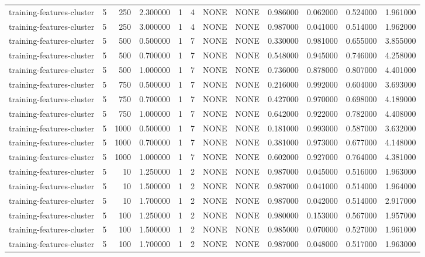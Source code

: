 \begin{tabular}{lrrrllllrrrr}
training-features-cluster & 5 & 250 & 2.300000 & 1 & 4 & NONE & NONE & 0.986000 & 0.062000 & 0.524000 & 1.961000 \\
training-features-cluster & 5 & 250 & 3.000000 & 1 & 4 & NONE & NONE & 0.987000 & 0.041000 & 0.514000 & 1.962000 \\
training-features-cluster & 5 & 500 & 0.500000 & 1 & 7 & NONE & NONE & 0.330000 & 0.981000 & 0.655000 & 3.855000 \\
training-features-cluster & 5 & 500 & 0.700000 & 1 & 7 & NONE & NONE & 0.548000 & 0.945000 & 0.746000 & 4.258000 \\
training-features-cluster & 5 & 500 & 1.000000 & 1 & 7 & NONE & NONE & 0.736000 & 0.878000 & 0.807000 & 4.401000 \\
training-features-cluster & 5 & 750 & 0.500000 & 1 & 7 & NONE & NONE & 0.216000 & 0.992000 & 0.604000 & 3.693000 \\
training-features-cluster & 5 & 750 & 0.700000 & 1 & 7 & NONE & NONE & 0.427000 & 0.970000 & 0.698000 & 4.189000 \\
training-features-cluster & 5 & 750 & 1.000000 & 1 & 7 & NONE & NONE & 0.642000 & 0.922000 & 0.782000 & 4.408000 \\
training-features-cluster & 5 & 1000 & 0.500000 & 1 & 7 & NONE & NONE & 0.181000 & 0.993000 & 0.587000 & 3.632000 \\
training-features-cluster & 5 & 1000 & 0.700000 & 1 & 7 & NONE & NONE & 0.381000 & 0.973000 & 0.677000 & 4.148000 \\
training-features-cluster & 5 & 1000 & 1.000000 & 1 & 7 & NONE & NONE & 0.602000 & 0.927000 & 0.764000 & 4.381000 \\
training-features-cluster & 5 & 10 & 1.250000 & 1 & 2 & NONE & NONE & 0.987000 & 0.045000 & 0.516000 & 1.963000 \\
training-features-cluster & 5 & 10 & 1.500000 & 1 & 2 & NONE & NONE & 0.987000 & 0.041000 & 0.514000 & 1.964000 \\
training-features-cluster & 5 & 10 & 1.700000 & 1 & 2 & NONE & NONE & 0.987000 & 0.042000 & 0.514000 & 2.917000 \\
training-features-cluster & 5 & 100 & 1.250000 & 1 & 2 & NONE & NONE & 0.980000 & 0.153000 & 0.567000 & 1.957000 \\
training-features-cluster & 5 & 100 & 1.500000 & 1 & 2 & NONE & NONE & 0.985000 & 0.070000 & 0.527000 & 1.961000 \\
training-features-cluster & 5 & 100 & 1.700000 & 1 & 2 & NONE & NONE & 0.987000 & 0.048000 & 0.517000 & 1.963000 \\

\end{tabular}

